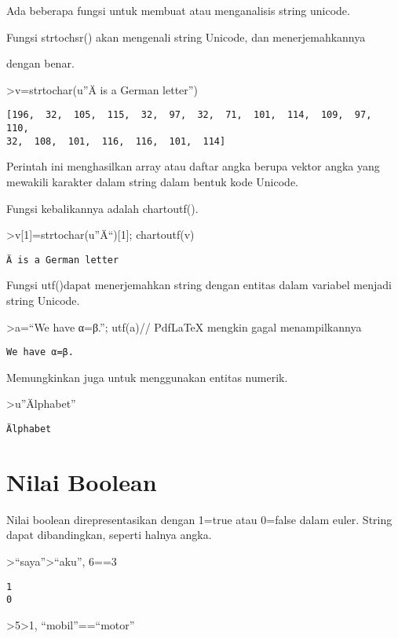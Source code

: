 \documentclass[
]{book}
\begin{document}
Ada beberapa fungsi untuk membuat atau menganalisis string unicode.

Fungsi strtochsr() akan mengenali string Unicode, dan menerjemahkannya

dengan benar.

\textgreater v=strtochar(u''Ä is a German letter'')

\begin{verbatim}
[196,  32,  105,  115,  32,  97,  32,  71,  101,  114,  109,  97,  110,
32,  108,  101,  116,  116,  101,  114]
\end{verbatim}

Perintah ini menghasilkan array atau daftar angka berupa vektor angka yang mewakili karakter dalam string dalam bentuk kode Unicode.

Fungsi kebalikannya adalah chartoutf().

\textgreater v{[}1{]}=strtochar(u''Ä``){[}1{]}; chartoutf(v)

\begin{verbatim}
Ä is a German letter
\end{verbatim}

Fungsi utf()dapat menerjemahkan string dengan entitas dalam variabel menjadi string Unicode.

\textgreater a=``We have α=β.''; utf(a)// PdfLaTeX mengkin gagal menampilkannya

\begin{verbatim}
We have α=β.
\end{verbatim}

Memungkinkan juga untuk menggunakan entitas numerik.

\textgreater u''Älphabet''

\begin{verbatim}
Älphabet
\end{verbatim}

\section{Nilai Boolean}\label{nilai-boolean}

Nilai boolean direpresentasikan dengan 1=true atau 0=false dalam euler. String dapat dibandingkan, seperti halnya angka.

\textgreater{}``saya''\textgreater{}``aku'', 6==3

\begin{verbatim}
1
0
\end{verbatim}

\textgreater5\textgreater1, ``mobil''==``motor''
\end{document}
